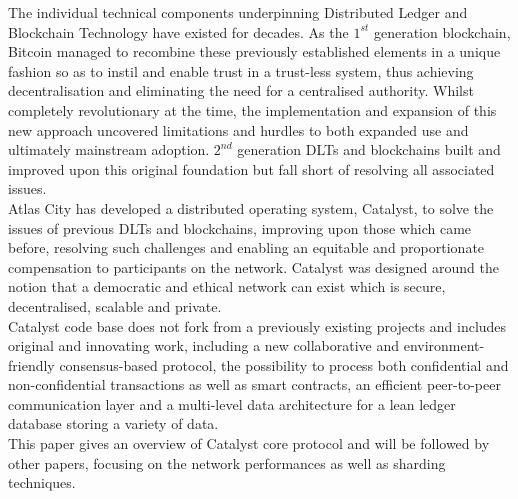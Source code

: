 The individual technical components underpinning Distributed Ledger and Blockchain Technology have existed for decades.  As the $1^{st}$ generation blockchain, Bitcoin managed to recombine these previously established elements in a unique fashion so as to instil and enable trust in a trust-less system, thus achieving decentralisation and eliminating the need for a centralised authority.  Whilst completely revolutionary at the time, the implementation and expansion of this new approach uncovered limitations and hurdles to both expanded use and ultimately mainstream adoption.  $2^{nd}$ generation DLTs and blockchains built and improved upon this original foundation but fall short of resolving all associated issues. \\
 
     Atlas City has developed a distributed operating system, Catalyst, to solve the issues of previous DLTs and blockchains, improving upon those which came before, resolving such challenges and enabling an equitable and proportionate compensation to participants on the network.  Catalyst was designed around the notion that a democratic and ethical network can exist which is secure, decentralised, scalable and private.  \\
 
 Catalyst code base does not fork from a previously existing projects and includes original and innovating work, including a new collaborative and environment-friendly consensus-based protocol, the possibility to process both confidential and non-confidential transactions as well as smart contracts, an efficient peer-to-peer communication layer and a multi-level data architecture for a lean ledger database storing a variety of data.\\
 
 This paper gives an overview of Catalyst core protocol and will be followed by other papers, focusing on the network performances as well as sharding techniques. 

